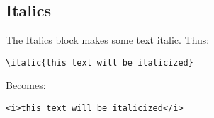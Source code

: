 \subsection{Italics}

The Italics block makes some text italic.
Thus:
\begin{verbatim}
\italic{this text will be italicized}
\end{verbatim}

Becomes:

\begin{verbatim}
<i>this text will be italicized</i>
\end{verbatim}
